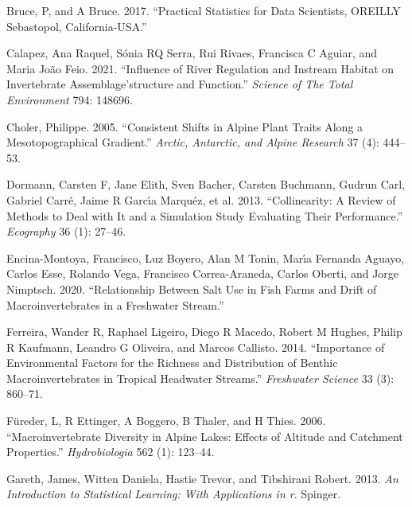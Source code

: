 \documentclass[
]{article}
\newlength{\cslhangindent}
\newlength{\cslentryspacingunit} %
\newenvironment{CSLReferences}[2] %
 {%
  \setlength{\parindent}{0pt}
  \ifodd #1
  \let\oldpar\par
  \def\par{\hangindent=\cslhangindent\oldpar}
  \fi
  \setlength{\parskip}{#2\cslentryspacingunit}
 }%
 {}
\begin{document}
\hypertarget{refs}{}
\begin{CSLReferences}{1}{0}
\leavevmode{}%
Bruce, P, and A Bruce. 2017. {``Practical Statistics for Data
Scientists, OREILLY Sebastopol, California-USA.''}

\leavevmode{}%
Calapez, Ana Raquel, Sónia RQ Serra, Rui Rivaes, Francisca C Aguiar, and
Maria João Feio. 2021. {``Influence of River Regulation and Instream
Habitat on Invertebrate Assemblage'structure and Function.''}
\emph{Science of The Total Environment} 794: 148696.

\leavevmode{}%
Choler, Philippe. 2005. {``Consistent Shifts in Alpine Plant Traits
Along a Mesotopographical Gradient.''} \emph{Arctic, Antarctic, and
Alpine Research} 37 (4): 444--53.

\leavevmode{}%
Dormann, Carsten F, Jane Elith, Sven Bacher, Carsten Buchmann, Gudrun
Carl, Gabriel Carré, Jaime R Garcı́a Marquéz, et al. 2013.
{``Collinearity: A Review of Methods to Deal with It and a Simulation
Study Evaluating Their Performance.''} \emph{Ecography} 36 (1): 27--46.

\leavevmode{}%
Encina-Montoya, Francisco, Luz Boyero, Alan M Tonin, Marı́a Fernanda
Aguayo, Carlos Esse, Rolando Vega, Francisco Correa-Araneda, Carlos
Oberti, and Jorge Nimptsch. 2020. {``Relationship Between Salt Use in
Fish Farms and Drift of Macroinvertebrates in a Freshwater Stream.''}

\leavevmode{}%
Ferreira, Wander R, Raphael Ligeiro, Diego R Macedo, Robert M Hughes,
Philip R Kaufmann, Leandro G Oliveira, and Marcos Callisto. 2014.
{``Importance of Environmental Factors for the Richness and Distribution
of Benthic Macroinvertebrates in Tropical Headwater Streams.''}
\emph{Freshwater Science} 33 (3): 860--71.

\leavevmode{}%
Füreder, L, R Ettinger, A Boggero, B Thaler, and H Thies. 2006.
{``Macroinvertebrate Diversity in Alpine Lakes: Effects of Altitude and
Catchment Properties.''} \emph{Hydrobiologia} 562 (1): 123--44.

\leavevmode{}%
Gareth, James, Witten Daniela, Hastie Trevor, and Tibshirani Robert.
2013. \emph{An Introduction to Statistical Learning: With Applications
in r}. Spinger.


\end{CSLReferences}
\end{document}
